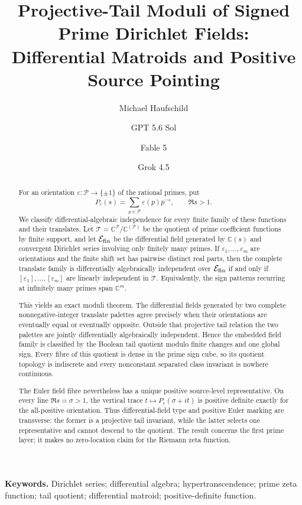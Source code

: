 \documentclass[11pt]{article}
\title{Projective-Tail Moduli of Signed Prime Dirichlet Fields:\\
Differential Matroids and Positive Source Pointing}
\author{Michael Haufschild \and GPT 5.6 Sol \and Fable 5 \and Grok 4.5}
\date{}
\theoremstyle{definition}
\theoremstyle{remark}
\newcommand{\C}{\mathbb C}
\begin{document}
\maketitle

\begin{abstract}
For an orientation \(\varepsilon:\mathcal P\to\{\pm1\}\) of the rational primes, put
\[
  P_\varepsilon(s)=\sum_{p\in\mathcal P}\varepsilon(p)p^{-s},
  \qquad \Re s>1.
\]
We classify differential-algebraic independence for every finite family of these functions and
their translates.  Let
\(\mathcal T=\C^{\mathcal P}/\C^{(\mathcal P)}\) be the quotient of prime
coefficient functions by finite support, and let \(\mathcal E_{\rm fin}\) be the differential
field generated by \(\C(s)\) and convergent Dirichlet series involving only finitely many
primes.  If \(\varepsilon_1,\ldots,\varepsilon_m\) are orientations and the finite shift set
has pairwise distinct real parts, then the complete translate family is differentially
algebraically independent over \(\mathcal E_{\rm fin}\) if and only if
\([\varepsilon_1],\ldots,[\varepsilon_m]\) are linearly independent in \(\mathcal T\).
Equivalently, the sign patterns recurring at infinitely many primes span \(\C^m\).

This yields an exact moduli theorem.  The differential fields generated by two complete
nonnegative-integer translate palettes agree precisely when their orientations are eventually
equal or eventually opposite.  Outside that projective tail relation the two palettes are jointly
differentially algebraically independent.  Hence the embedded field family is classified by the
Boolean tail quotient modulo finite changes and one global sign.  Every fibre of this quotient is
dense in the prime sign cube, so its quotient topology is indiscrete and every nonconstant
separated class invariant is nowhere continuous.

The Euler field fibre nevertheless has a unique positive source-level representative.  On every
line \(\Re s=\sigma>1\),
the vertical trace \(t\mapsto P_\varepsilon(\sigma+it)\) is positive definite exactly for the
all-positive orientation.  Thus differential-field type and positive Euler marking are transverse:
the former is a projective tail invariant, while the latter selects one representative and cannot
descend to the quotient.  The result concerns the first prime layer; it makes no zero-location
claim for the Riemann zeta function.
\end{abstract}

\noindent\textbf{Keywords.}
Dirichlet series; differential algebra; hypertranscendence; prime zeta function; tail quotient;
differential matroid; positive-definite function.
\end{document}

